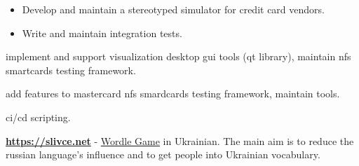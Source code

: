 \documentclass[10pt,a4paper,ragged2e,withhyper]{altacv}
\begin{document}
\begin{itemize}
\item Develop and maintain a stereotyped simulator for credit card vendors.
\item Write and maintain integration tests.
\end{itemize}


 implement and support visualization desktop gui tools (qt library),
maintain nfs smartcards testing framework.

 add features to mastercard nfs smardcards testing
framework, maintain tools.

 ci/cd scripting.

\href{https://slivce.net}{\textbf{https://slivce.net}} -
\href{https://en.wikipedia.org/wiki/Wordle}{Wordle Game} in Ukrainian. The main aim is to reduce the
russian language's influence and to get people into Ukrainian vocabulary.

\divider

\divider


\end{document}
